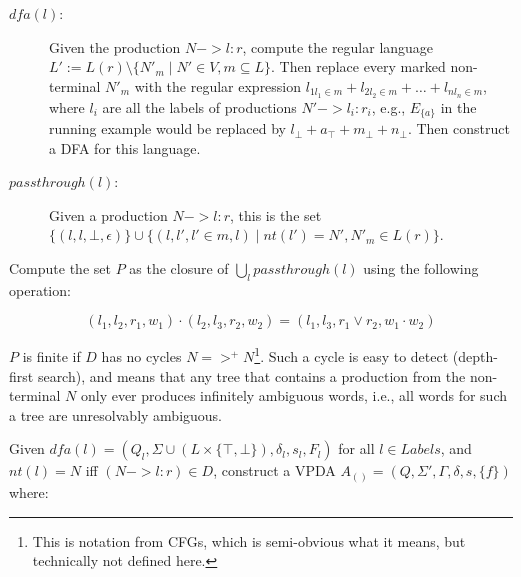 \documentclass[acmsmall,review,anonymous]{acmart}\settopmatter{printfolios=true,printccs=false,printacmref=false}
\newcommand{\NT}{V} %
\newcommand{\T}{\Sigma} %
\newcommand{\Labels}{L} %
\newcommand{\pospl}{(}
\newcommand{\pospr}{)}
\newcommand{\posp}[1]{\pospl#1\pospr}
\newcommand{\dfa}{\mathit{dfa}} %
\newcommand{\passthrough}{\mathit{passthrough}} %
\newcommand{\nt}{\mathit{nt}} %
\begin{document}
\begin{description}
\item[$\dfa(l)$:] Given the production $N -> l : r$, compute the regular language $L' := L(r) \setminus \{N'_m \mid N' \in \NT, m \subseteq \Labels\}$. Then replace every marked non-terminal $N'_m$ with the regular expression $l_{1l_1 \in m} + l_{2l_2 \in m} + \ldots + l_{nl_n \in m}$, where $l_i$ are all the labels of productions $N' -> l_i : r_i$, e.g., $E_{\{a\}}$ in the running example would be replaced by $l_\bot + a_\top + m_\bot + n_\bot$. Then construct a DFA for this language.

\item[$\passthrough(l)$:] Given a production $N -> l : r$, this is the set $\{(l, l, \bot, \epsilon)\} \cup \{(l, l', l' \in m, l) \mid \nt(l') = N', N'_m \in L(r)\}$.
\end{description}

\noindent Compute the set $P$ as the closure of $\bigcup_l \passthrough(l)$ using the following operation:

$$ (l_1, l_2, r_1, w_1) \cdot (l_2, l_3, r_2, w_2) = (l_1, l_3, r_1 \lor r_2, w_1 \cdot w_2) $$

\noindent $P$ is finite if $D$ has no cycles $N =>^{+} N$\footnote{This is notation from CFGs, which is semi-obvious what it means, but technically not defined here.}. Such a cycle is easy to detect (depth-first search), and means that any tree that contains a production from the non-terminal $N$ only ever produces infinitely ambiguous words, i.e., all words for such a tree are unresolvably ambiguous.

Given $\dfa(l) = (Q_l, \T \cup (\Labels \times \{\top, \bot\}), \delta_l, s_l, F_l)$ for all $l \in Labels$, and $\nt(l) = N$ iff $(N -> l : r) \in D$, construct a VPDA $A_{\posp{}} = (Q, \T', \Gamma, \delta, s, \{f\})$ where:
\end{document}

